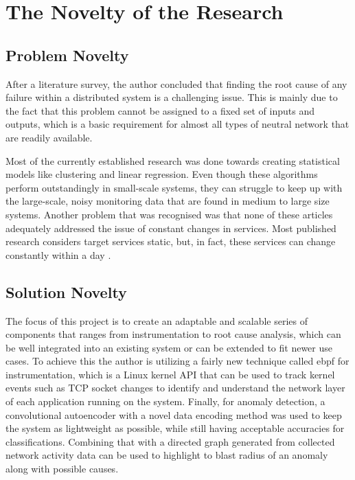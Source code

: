 \section{The Novelty of the Research}

\subsection{Problem Novelty}

After a literature survey, the author concluded that finding the root cause of any failure within a distributed system is a challenging issue. This is mainly due to the fact that this problem cannot be assigned to a fixed set of inputs and outputs, which is a basic requirement for almost all types of neutral network that are readily available. 


Most of the currently established research was done towards creating statistical models like clustering and linear regression. Even though these algorithms perform outstandingly in small-scale systems, they can struggle to keep up with the large-scale, noisy monitoring data that are found in medium to large size systems. Another problem that was recognised was that none of these articles adequately addressed the issue of constant changes in services. Most published research considers target services static, but, in fact, these services can change constantly within a day \citep{GoingtoM51:online}.

\subsection{Solution Novelty}


The focus of this project is to create an adaptable and scalable series of components that ranges from instrumentation to root cause analysis, which can be well integrated into an existing system or can be extended to fit newer use cases. To achieve this the author is utilizing a fairly new technique called \ac{ebpf} for instrumentation, which is a Linux kernel API that can be used to track kernel events such as TCP socket changes to identify and understand the network layer of each application running on the system. Finally, for anomaly detection, a convolutional autoencoder with a novel data encoding method was used to keep the system as lightweight as possible, while still having acceptable accuracies for classifications. Combining that with a directed graph generated from collected network activity data can be used to highlight to blast radius of an anomaly along with possible causes.